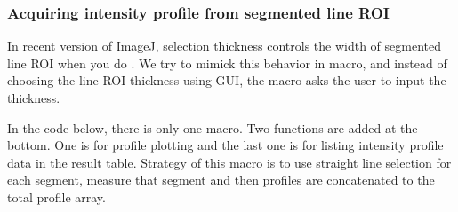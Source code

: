 
\subsubsection{Acquiring intensity profile from segmented line ROI}
 
In recent version of ImageJ, selection thickness controls the width of segmented
line ROI when you do . We try to mimick this
behavior in macro, and instead of choosing the line ROI thickness using GUI, the
macro asks the user to input the thickness. 

In the code below, there is only one macro. Two functions are added at the
bottom. One is for profile plotting and the last one is for listing
intensity profile data in the result table. Strategy of this macro is to use
straight line selection for each segment, measure that segment and then profiles
are concatenated to the total profile array.

%
%


